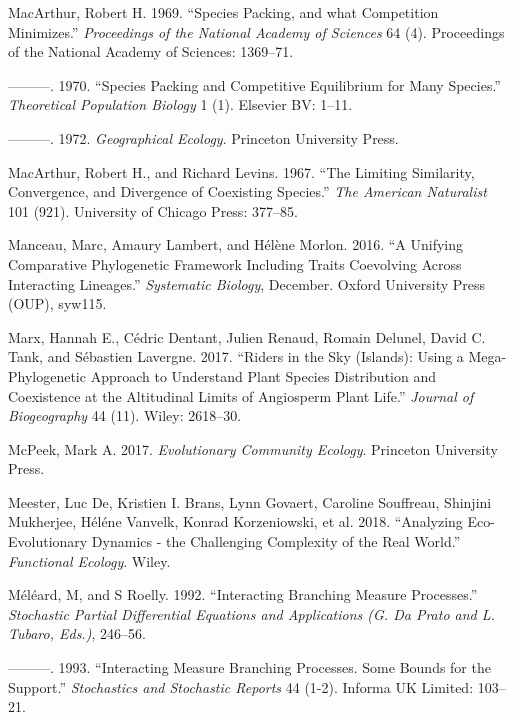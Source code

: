 \documentclass[]{article}
\begin{document}
\leavevmode\hypertarget{ref-Arthur1969}{}%
MacArthur, Robert H. 1969. ``Species Packing, and what Competition
Minimizes.'' \emph{Proceedings of the National Academy of Sciences} 64
(4). Proceedings of the National Academy of Sciences: 1369--71.

\leavevmode\hypertarget{ref-MacArthur1970}{}%
---------. 1970. ``Species Packing and Competitive Equilibrium for Many
Species.'' \emph{Theoretical Population Biology} 1 (1). Elsevier BV:
1--11.

\leavevmode\hypertarget{ref-9780691023823}{}%
---------. 1972. \emph{Geographical Ecology}. Princeton University
Press.

\leavevmode\hypertarget{ref-Macarthur1967}{}%
MacArthur, Robert H., and Richard Levins. 1967. ``The Limiting
Similarity, Convergence, and Divergence of Coexisting Species.''
\emph{The American Naturalist} 101 (921). University of Chicago Press:
377--85.

\leavevmode\hypertarget{ref-Manceau2016}{}%
Manceau, Marc, Amaury Lambert, and Hélène Morlon. 2016. ``A Unifying
Comparative Phylogenetic Framework Including Traits Coevolving Across
Interacting Lineages.'' \emph{Systematic Biology}, December. Oxford
University Press (OUP), syw115.

\leavevmode\hypertarget{ref-Marx2017}{}%
Marx, Hannah E., Cédric Dentant, Julien Renaud, Romain Delunel, David C.
Tank, and Sébastien Lavergne. 2017. ``Riders in the Sky (Islands): Using
a Mega-Phylogenetic Approach to Understand Plant Species Distribution
and Coexistence at the Altitudinal Limits of Angiosperm Plant Life.''
\emph{Journal of Biogeography} 44 (11). Wiley: 2618--30.

\leavevmode\hypertarget{ref-markmcpeek2017}{}%
McPeek, Mark A. 2017. \emph{Evolutionary Community Ecology}. Princeton
University Press.

\leavevmode\hypertarget{ref-DeMeester2018}{}%
Meester, Luc De, Kristien I. Brans, Lynn Govaert, Caroline Souffreau,
Shinjini Mukherjee, Héléne Vanvelk, Konrad Korzeniowski, et al. 2018.
``Analyzing Eco-Evolutionary Dynamics - the Challenging Complexity of
the Real World.'' \emph{Functional Ecology}. Wiley.

\leavevmode\hypertarget{ref-meleard1992interacting}{}%
Méléard, M, and S Roelly. 1992. ``Interacting Branching Measure
Processes.'' \emph{Stochastic Partial Differential Equations and
Applications (G. Da Prato and L. Tubaro, Eds.)}, 246--56.

\leavevmode\hypertarget{ref-Mlard1993}{}%
---------. 1993. ``Interacting Measure Branching Processes. Some Bounds
for the Support.'' \emph{Stochastics and Stochastic Reports} 44 (1-2).
Informa UK Limited: 103--21.
\end{document}
